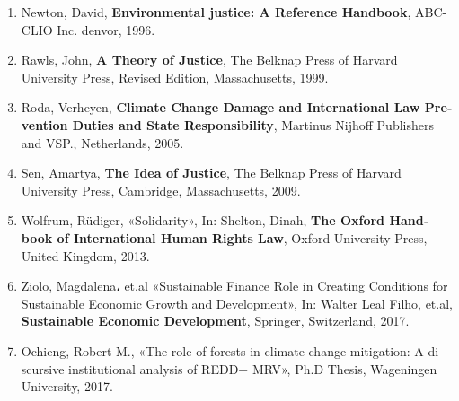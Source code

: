 {\begin{latin}
{\begin{enumerate}
						\item Newton, David, \textbf{Environmental justice: A Reference  Handbook}, ABC-CLIO Inc. denvor, 1996.
			
			\item Rawls, John, \textbf{A Theory of Justice}, The Belknap Press of Harvard University Press, Revised Edition, Massachusetts, 1999.
			
			

			
			
			\item Roda, Verheyen, \textbf{Climate Change Damage and International Law Prevention Duties and State Responsibility}, Martinus Nijhoff Publishers and VSP., Netherlands, 2005.
			
			\item Sen, Amartya, \textbf{The Idea of Justice}, The Belknap Press of Harvard University Press, Cambridge, Massachusetts, 2009.
			\item Wolfrum, Rüdiger, «Solidarity», In: Shelton, Dinah, \textbf{The Oxford Handbook of International Human Rights Law}, Oxford University Press, United Kingdom, 2013.
			 \item Ziolo, Magdalena، et.al «Sustainable Finance Role in Creating Conditions for Sustainable Economic Growth and Development», In: Walter Leal Filho, et.al, \textbf{Sustainable Economic Development}, Springer, Switzerland, 2017.
			 
			 \item Ochieng, Robert M., «The role of forests in climate change mitigation: A discursive institutional analysis of REDD+ MRV», Ph.D Thesis, Wageningen University, 2017.		
			 
			
		\end{enumerate}
	}


\end{latin}}
